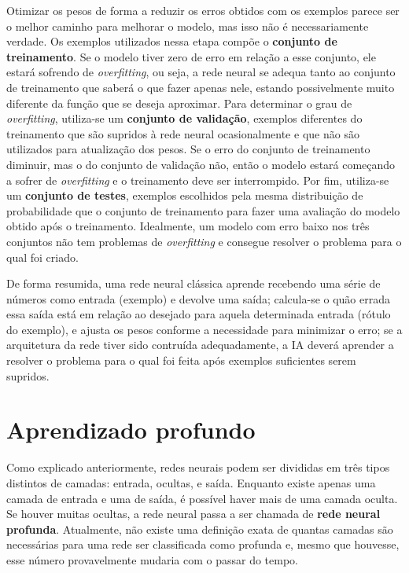 Otimizar os pesos de forma a reduzir os erros obtidos com os exemplos parece ser o melhor caminho para melhorar o modelo, mas isso não é necessariamente verdade.
Os exemplos utilizados nessa etapa compõe o \textbf{conjunto de treinamento}.
Se o modelo tiver zero de erro em relação a esse conjunto, ele estará sofrendo de \textit{overfitting}, ou seja, a rede neural se adequa tanto ao conjunto de treinamento que saberá o que fazer apenas nele, estando possivelmente muito diferente da função que se deseja aproximar.
Para determinar o grau de \textit{overfitting}, utiliza-se um \textbf{conjunto de validação}, exemplos diferentes do treinamento que são supridos à rede neural ocasionalmente e que não são utilizados para atualização dos pesos.
Se o erro do conjunto de treinamento diminuir, mas o do conjunto de validação não, então o modelo estará começando a sofrer de \textit{overfitting} e o treinamento deve ser interrompido.
Por fim, utiliza-se um \textbf{conjunto de testes}, exemplos escolhidos pela mesma distribuição de probabilidade que o conjunto de treinamento para fazer uma avaliação do modelo obtido após o treinamento.
Idealmente, um modelo com erro baixo nos três conjuntos não tem problemas de \textit{overfitting} e consegue resolver o problema para o qual foi criado.

De forma resumida, uma rede neural clássica aprende recebendo uma série de números como entrada (exemplo) e devolve uma saída;
calcula-se o quão errada essa saída está em relação ao desejado para aquela determinada entrada (rótulo do exemplo), e ajusta os pesos conforme a necessidade para minimizar o erro;
se a arquitetura da rede tiver sido contruída adequadamente, a IA deverá aprender a resolver o problema para o qual foi feita após exemplos suficientes serem supridos.


\section{Aprendizado profundo}
\label{sec:dl}

Como explicado anteriormente, redes neurais podem ser divididas em três tipos distintos de camadas: entrada, ocultas, e saída.
Enquanto existe apenas uma camada de entrada e uma de saída, é possível haver mais de uma camada oculta.
Se houver muitas ocultas, a rede neural passa a ser chamada de \textbf{rede neural profunda}.
Atualmente, não existe uma definição exata de quantas camadas são necessárias para uma rede ser classificada como profunda e, mesmo que houvesse, esse número provavelmente mudaria com o passar do tempo.

